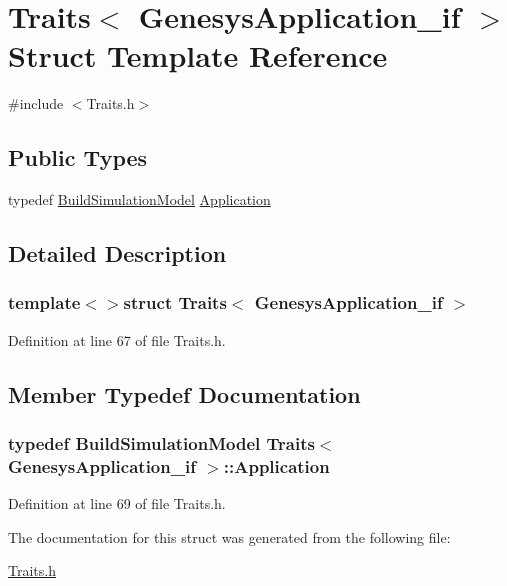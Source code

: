 \hypertarget{struct_traits_3_01_genesys_application__if_01_4}{\section{Traits$<$ Genesys\-Application\-\_\-if $>$ Struct Template Reference}
\label{struct_traits_3_01_genesys_application__if_01_4}
}


{\ttfamily \#include $<$Traits.\-h$>$}

\subsection*{Public Types}
\begin{DoxyCompactItemize}
\item 
typedef \hyperlink{class_build_simulation_model}{Build\-Simulation\-Model} \hyperlink{struct_traits_3_01_genesys_application__if_01_4_af0589b9f1736bfc743309ed001e2b796}{Application}
\end{DoxyCompactItemize}


\subsection{Detailed Description}
\subsubsection*{template$<$$>$struct Traits$<$ Genesys\-Application\-\_\-if $>$}



Definition at line 67 of file Traits.\-h.



\subsection{Member Typedef Documentation}
\hypertarget{struct_traits_3_01_genesys_application__if_01_4_af0589b9f1736bfc743309ed001e2b796}{
\subsubsection[{Application}]{\setlength{\rightskip}{0pt plus 5cm}typedef {\bf Build\-Simulation\-Model} {\bf Traits}$<$ {\bf Genesys\-Application\-\_\-if} $>$\-::{\bf Application}}}\label{struct_traits_3_01_genesys_application__if_01_4_af0589b9f1736bfc743309ed001e2b796}


Definition at line 69 of file Traits.\-h.



The documentation for this struct was generated from the following file\-:\begin{DoxyCompactItemize}
\item 
\hyperlink{_traits_8h}{Traits.\-h}\end{DoxyCompactItemize}
